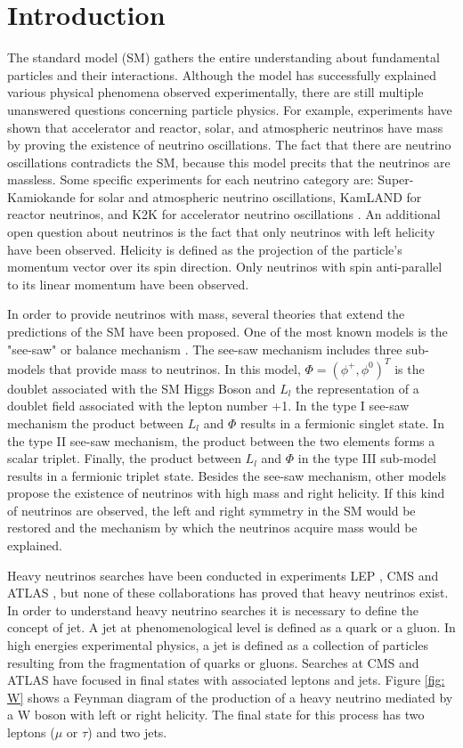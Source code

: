\chapter{Introduction}

The standard model (SM) gathers the entire understanding about fundamental particles and their interactions. Although the model has successfully explained various physical phenomena observed experimentally, there are still multiple unanswered questions concerning particle physics. For example, experiments \cite{Detectores} have shown that accelerator and reactor, solar, and atmospheric neutrinos have mass by proving the existence of neutrino oscillations. The fact that there are neutrino oscillations contradicts the SM, because this model precits that the neutrinos are massless. Some specific experiments for each neutrino category are: Super-Kamiokande \cite{Super-Kamiokande} for solar and atmospheric neutrino oscillations, KamLAND \cite{KamLAND} for reactor neutrinos, and K2K \cite{K2K} for accelerator neutrino oscillations \cite{Experimentos}. An additional open question about neutrinos is the fact that only neutrinos with left helicity have been observed. Helicity is defined as the projection of the particle's momentum vector over its spin direction. Only neutrinos with spin anti-parallel to its linear momentum have been observed.

In order to provide neutrinos with mass, several theories that extend the predictions of the SM have been proposed. One of the most known models is the "see-saw" or balance mechanism \cite{See-saw}. The see-saw mechanism includes three sub-models that provide mass to neutrinos. In this model, $\Phi = (\phi^{+}, \phi^{0})^{T}$ is the doublet associated with the SM Higgs Boson and $L_{l}$ the representation of a doublet field associated with the lepton number +1. In the type I see-saw mechanism the product between $L_{l}$ and $\Phi$ results in a fermionic singlet state. In the type II see-saw mechanism, the product between the two elements forms a scalar triplet. Finally, the product between $L_{l}$ and $\Phi$ in the type III sub-model results in a fermionic triplet state. Besides the see-saw mechanism, other models propose the existence of neutrinos with high mass and right helicity. If this kind of neutrinos are observed, the left and right symmetry in the SM would be restored and the mechanism by which the neutrinos acquire mass would be explained.

Heavy neutrinos searches have been conducted in experiments LEP \cite{LEP}, CMS and ATLAS \cite{CMS ATLAS}, but none of these collaborations has proved that heavy neutrinos exist. In order to understand heavy neutrino searches it is necessary to define the concept of jet. A jet at phenomenological level is defined as a quark or a gluon. In high energies experimental physics, a jet is defined as a collection of particles resulting from the fragmentation of quarks or gluons. Searches at CMS and ATLAS have focused in final states with associated leptons and jets. Figure \ref{fig: W} shows a Feynman diagram of the production of a heavy neutrino mediated by a W boson with left or right helicity. The final state for this process has two leptons ($\mu$ or $\tau$) and two jets.

